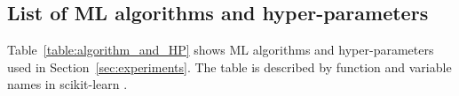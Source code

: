 \subsection{List of ML algorithms and hyper-parameters}
\label{app:MLAlg_and_HP}

Table~\ref{table:algorithm_and_HP} shows ML algorithms and hyper-parameters used in Section~\ref{sec:experiments}.
%
The table is described by function and variable names in scikit-learn \cite{scikit-learn}.
%
